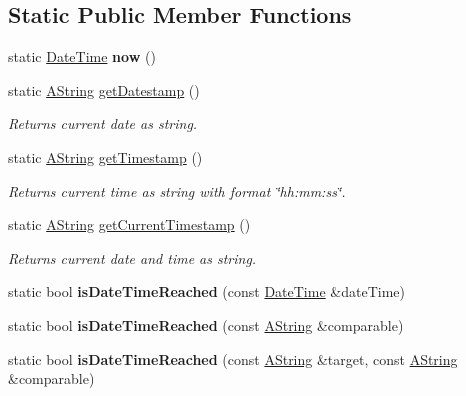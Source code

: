 \subsection*{Static Public Member Functions}
\begin{DoxyCompactItemize}
\item 
\mbox{\label{class_date_time_af28627b5a5a2cdc02f5fc388b07c91e7}} 
static \mbox{\hyperlink{class_date_time}{Date\+Time}} {\bfseries now} ()
\item 
static \mbox{\hyperlink{class_a_string}{A\+String}} \mbox{\hyperlink{class_date_time_ab8bbdb70e38a18cad9269b6f856f5634}{get\+Datestamp}} ()
\begin{DoxyCompactList}\small\item\em Returns current date as string. \end{DoxyCompactList}\item 
static \mbox{\hyperlink{class_a_string}{A\+String}} \mbox{\hyperlink{class_date_time_a272b1eca3f3aafc7d275ec5e8831a6ca}{get\+Timestamp}} ()
\begin{DoxyCompactList}\small\item\em Returns current time as string with format \char`\"{}hh\+:mm\+:ss\char`\"{}. \end{DoxyCompactList}\item 
static \mbox{\hyperlink{class_a_string}{A\+String}} \mbox{\hyperlink{class_date_time_aee3108295b202fc4807984c25778c942}{get\+Current\+Timestamp}} ()
\begin{DoxyCompactList}\small\item\em Returns current date and time as string. \end{DoxyCompactList}\item 
\mbox{\label{class_date_time_a89b84ed7da498312b8ed3cdb0b6a456a}} 
static bool {\bfseries is\+Date\+Time\+Reached} (const \mbox{\hyperlink{class_date_time}{Date\+Time}} \&date\+Time)
\item 
\mbox{\label{class_date_time_a176d5523d168c32a5278e26dafe82749}} 
static bool {\bfseries is\+Date\+Time\+Reached} (const \mbox{\hyperlink{class_a_string}{A\+String}} \&comparable)
\item 
\mbox{\label{class_date_time_a3b2ff010af339275c62f0fd2c5949ac7}} 
static bool {\bfseries is\+Date\+Time\+Reached} (const \mbox{\hyperlink{class_a_string}{A\+String}} \&target, const \mbox{\hyperlink{class_a_string}{A\+String}} \&comparable)

\end{DoxyCompactItemize}
